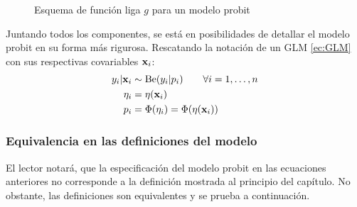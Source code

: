 \documentclass[../Main/Main.tex]{subfiles}
\begin{document}
\begin{figure}[h]
\centering
{}
\caption{Esquema de función liga $g$ para un modelo probit}
\label{fig:DiagramaFuncLiga}
\end{figure}

Juntando todos los componentes, se está en posibilidades de detallar el modelo probit en su forma más rigurosa. Rescatando la notación de un GLM \eqref{ec:GLM} con sus respectivas covariables $\mathbf{x}_i$: 
\begin{align}
y_i|\mathbf{x}_i & \sim \text{Be}(y_i|p_i) \qquad \forall i = 1,\ldots,n\label{ec:ModProbitA}\\
\eta_i &= \eta(\mathbf{x}_i) \label{ec:ModProbitB} \\
p_i &= \Phi(\eta_i) = \Phi(\eta(\mathbf{x}_i)) \label{ec:ModProbitC}
\end{align}

\subsubsection*{Equivalencia en las definiciones del modelo}
El lector notará, que la especificación del modelo probit en las ecuaciones anteriores no corresponde a la definición mostrada al principio del capítulo. No obstante, las definiciones son equivalentes y se prueba a continuación.\\
\end{document}
